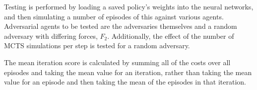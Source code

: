 \documentclass[../main.tex]{subfiles}
\begin{document}
Testing is performed by loading a saved policy's weights into the neural networks, and then simulating a number of episodes of this against various agents. Adversarial agents to be tested are the adversaries themselves and a random adversary with differing forces, $F_2$. Additionally, the effect of the number of MCTS simulations per step is tested for a random adversary. 

The mean iteration score is calculated by summing all of the costs over all episodes and taking the mean value for an iteration, rather than taking the mean value for an episode and then taking the mean of the episodes in that iteration.

\onlyinsubfile{\appendix}
\onlyinsubfile{}
\end{document}
